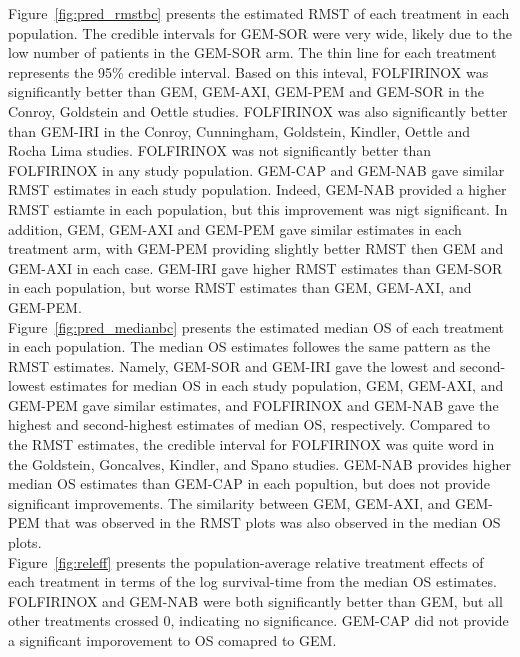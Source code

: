 Figure~\ref{fig:pred_rmstbc} presents the estimated RMST of each treatment in each population. The credible intervals for GEM-SOR were very wide, likely due to the low number of patients in the GEM-SOR arm. The thin line for each treatment represents the 95\% credible interval. Based on this inteval, FOLFIRINOX was significantly better than GEM, GEM-AXI, GEM-PEM and GEM-SOR in the Conroy, Goldstein and Oettle studies. FOLFIRINOX was also significantly better than GEM-IRI in the Conroy, Cunningham, Goldstein, Kindler, Oettle and Rocha Lima studies. FOLFIRINOX was not significantly better than FOLFIRINOX in any study population. GEM-CAP and GEM-NAB gave similar RMST estimates in each study population. Indeed, GEM-NAB provided a higher RMST estiamte in each population, but this improvement was nigt significant. In addition, GEM, GEM-AXI and GEM-PEM gave similar estimates in each treatment arm, with GEM-PEM providing slightly better RMST then GEM and GEM-AXI in each case. GEM-IRI gave higher RMST estimates than GEM-SOR in each population, but worse RMST estimates than GEM, GEM-AXI, and GEM-PEM. \\

Figure~\ref{fig:pred_medianbc} presents the estimated median OS of each treatment in each population. The median OS estimates followes the same pattern as the RMST estimates. Namely, GEM-SOR and GEM-IRI gave the lowest and second-lowest estimates for median OS in each study population, GEM, GEM-AXI, and GEM-PEM gave similar estimates, and FOLFIRINOX and GEM-NAB gave the highest and second-highest estimates of median OS, respectively. Compared to the RMST estimates, the credible interval for FOLFIRINOX was quite word in the Goldstein, Goncalves, Kindler, and Spano studies. GEM-NAB provides higher median OS estimates than GEM-CAP in each popultion, but does not provide significant improvements. The similarity between GEM, GEM-AXI, and GEM-PEM that was observed in the RMST plots was also observed in the median OS plots. \\ 

Figure~\ref{fig:releff} presents the population-average relative treatment effects of each treatment in terms of the log survival-time from the median OS estimates. FOLFIRINOX and GEM-NAB were both significantly better than GEM, but all other treatments crossed 0, indicating no significance. GEM-CAP did not provide a significant imporovement to OS comapred to GEM. \\

